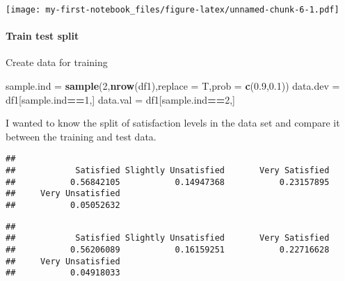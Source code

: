 \documentclass[
]{article}
\newenvironment{Shaded}{\begin{snugshade}}{\end{snugshade}}
\newcommand{\CommentTok}[1]{\textcolor[rgb]{0.56,0.35,0.01}{\textit{#1}}}
\newcommand{\DataTypeTok}[1]{\textcolor[rgb]{0.13,0.29,0.53}{#1}}
\newcommand{\DecValTok}[1]{\textcolor[rgb]{0.00,0.00,0.81}{#1}}
\newcommand{\FloatTok}[1]{\textcolor[rgb]{0.00,0.00,0.81}{#1}}
\newcommand{\KeywordTok}[1]{\textcolor[rgb]{0.13,0.29,0.53}{\textbf{#1}}}
\newcommand{\NormalTok}[1]{#1}
\newcommand{\OperatorTok}[1]{\textcolor[rgb]{0.81,0.36,0.00}{\textbf{#1}}}
\newcommand{\StringTok}[1]{\textcolor[rgb]{0.31,0.60,0.02}{#1}}
\begin{document}
\texttt{[image: my-first-notebook\_files/figure-latex/unnamed-chunk-6-1.pdf]}

\hypertarget{train-test-split}{%
\paragraph{Train test split}\label{train-test-split}}

Create data for training

\begin{Shaded}
\begin{Highlighting}[]
\NormalTok{sample.ind =}\StringTok{ }\KeywordTok{sample}\NormalTok{(}\DecValTok{2}\NormalTok{,}\KeywordTok{nrow}\NormalTok{(df1),}\DataTypeTok{replace =}\NormalTok{ T,}\DataTypeTok{prob =} \KeywordTok{c}\NormalTok{(}\FloatTok{0.9}\NormalTok{,}\FloatTok{0.1}\NormalTok{))}
\NormalTok{data.dev =}\StringTok{ }\NormalTok{df1[sample.ind}\OperatorTok{==}\DecValTok{1}\NormalTok{,]  }
\NormalTok{data.val =}\StringTok{ }\NormalTok{df1[sample.ind}\OperatorTok{==}\DecValTok{2}\NormalTok{,]}
\end{Highlighting}
\end{Shaded}

I wanted to know the split of satisfaction levels in the data set and
compare it between the training and test data.

\begin{Shaded}
\end{Shaded}

\begin{verbatim}
## 
##            Satisfied Slightly Unsatisfied       Very Satisfied 
##           0.56842105           0.14947368           0.23157895 
##     Very Unsatisfied 
##           0.05052632
\end{verbatim}

\begin{Shaded}
\end{Shaded}

\begin{verbatim}
## 
##            Satisfied Slightly Unsatisfied       Very Satisfied 
##           0.56206089           0.16159251           0.22716628 
##     Very Unsatisfied 
##           0.04918033
\end{verbatim}
\end{document}
